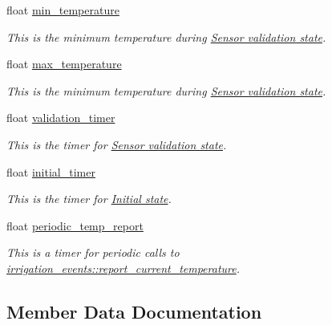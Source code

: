 \begin{DoxyCompactItemize}
\item 
float \hyperlink{structirrigation__controller__status_a451e58983d5995bf6f1e00f9318d5dd6}{min\+\_\+temperature}
\begin{DoxyCompactList}\small\item\em This is the minimum temperature during \hyperlink{group__state__validate}{Sensor validation state}. \end{DoxyCompactList}\item 
float \hyperlink{structirrigation__controller__status_a1bd8f83a44ee01d3b7cf3851b6716f02}{max\+\_\+temperature}
\begin{DoxyCompactList}\small\item\em This is the minimum temperature during \hyperlink{group__state__validate}{Sensor validation state}. \end{DoxyCompactList}\item 
float \hyperlink{structirrigation__controller__status_a360e7ee7f6ac54635fc66035883d2d9c}{validation\+\_\+timer}
\begin{DoxyCompactList}\small\item\em This is the timer for \hyperlink{group__state__validate}{Sensor validation state}. \end{DoxyCompactList}\item 
float \hyperlink{structirrigation__controller__status_a9d70c74fe395ec2720089b929a32e1e9}{initial\+\_\+timer}
\begin{DoxyCompactList}\small\item\em This is the timer for \hyperlink{group__state__init}{Initial state}. \end{DoxyCompactList}\item 
float \hyperlink{structirrigation__controller__status_aab428bb9e677098d336aefd32b5e6232}{periodic\+\_\+temp\+\_\+report}
\begin{DoxyCompactList}\small\item\em This is a timer for periodic calls to \hyperlink{structirrigation__events_a47b81edd52377b4c4e1ed512b830e237}{irrigation\+\_\+events\+::report\+\_\+current\+\_\+temperature}. \end{DoxyCompactList}\end{DoxyCompactItemize}


\subsection{Member Data Documentation}
\hypertarget{structirrigation__controller__status_a0a4447a8aa2200bacf97bd7e844493c1}{}
